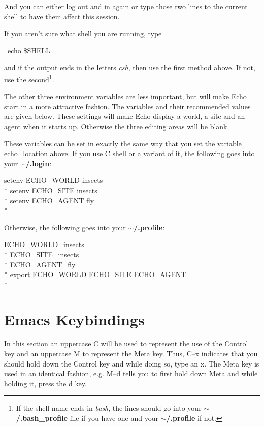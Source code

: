 \begin{itemize}
And you can either log out and in again or type those two lines to the
current shell to have them affect this session.

If you aren't sure what shell you are running, type

\begin{shell}
\prompt\ echo \$SHELL
\end{shell}

and if the output ends in the letters {\sl csh}, then use the first
method above. If not, use the second\footnote{If the shell name ends
in {\sl bash}, the lines should go into your {\bf
$\sim$/.bash\_profile} file if you have one and your {\bf
$\sim$/.profile} if not.}.

The other three environment variables are less important, but will
make Echo start in a more attractive fashion. The variables and their
recommended values are given below.  These settings will make Echo
display a world, a site and an agent when it starts up. Otherwise the
three editing areas will be blank.

These variables can be set in exactly the same way that you set the
variable {\sc echo\_location} above. If you use C shell or a variant
of it, the following goes into your {\bf $\sim$/.login}:

\begin{shell}
setenv ECHO\_WORLD insects \\*
setenv ECHO\_SITE insects \\*
setenv ECHO\_AGENT fly \\*
\end{shell}

Otherwise, the following goes into your {\bf $\sim$/.profile}:

\begin{shell}
ECHO\_WORLD=insects \\*
ECHO\_SITE=insects \\*
ECHO\_AGENT=fly \\*
export ECHO\_WORLD ECHO\_SITE ECHO\_AGENT \\*
\end{shell}

\end{itemize}

\newpage
\section{Emacs Keybindings}
\label{emacs-keybindings}

In this section an uppercase {\sf C} will be used to represent the use
of the Control key and an uppercase {\sf M} to represent the Meta
key. Thus, {\sf C--x} indicates that you should hold down the Control
key and while doing so, type an {\sf x}. The Meta key is used in an
identical fashion, e.g.  {\sf M--d} tells you to first hold down Meta
and while holding it, press the {\sf d} key.

